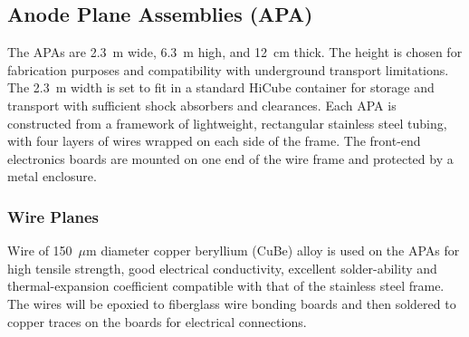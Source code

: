 \subsection{Anode Plane Assemblies (APA)}
\label{subsec:fd-ref-apa}

The APAs are 2.3~m wide, 6.3~m high, and 12~cm thick. The height is
chosen for fabrication purposes and compatibility with underground
transport limitations. The 2.3~m width is set to fit in a standard
HiCube container for storage and transport with sufficient shock
absorbers and clearances.  Each APA is constructed from a framework of
lightweight, rectangular stainless steel tubing, with four layers of
wires wrapped on each side of the frame. The front-end electronics
boards are mounted on one end of the wire frame and protected by a
metal enclosure.


\subsubsection{Wire Planes}
\label{subsec:fd-ref-wireplanes}

Wire of 150~$\mu$m diameter copper beryllium (CuBe) alloy is used on the
APAs for high tensile strength, good electrical conductivity,
excellent solder-ability and thermal-expansion coefficient
compatible with that of the stainless steel frame.  The wires will be
epoxied to fiberglass wire bonding boards and then soldered to copper
traces on the boards for electrical connections.

